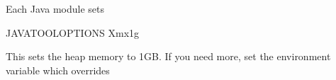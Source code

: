 \documentclass[letterpaper,10pt,english]{sphinxmanual}
\begin{document}
Each Java module sets

\begin{sphinxVerbatim}[commandchars=\\\{\}]
\PYGZus{}JAVA\PYGZus{}TOOL\PYGZus{}OPTIONS \PYGZhy{}Xmx1g
\end{sphinxVerbatim}

This sets the heap memory to 1GB. If you need more, set the environment variable  which overrides 

\begin{sphinxVerbatim}[commandchars=\\\{\}]
 
\end{sphinxVerbatim}
\end{document}
